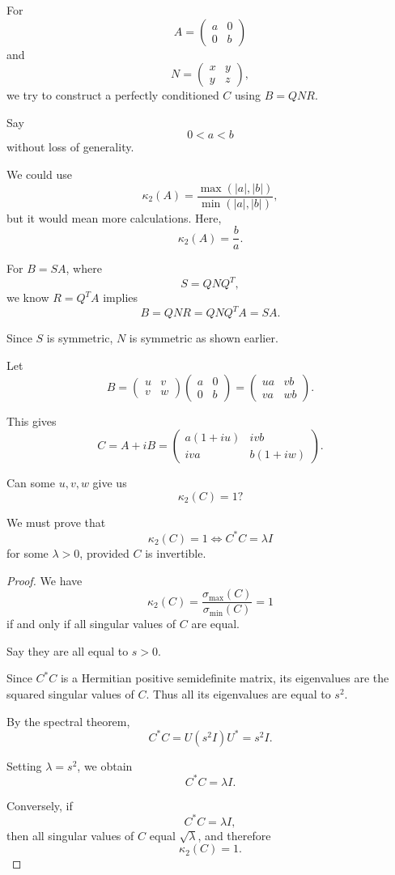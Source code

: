 \documentclass[11pt, reqno, a4paper]{amsart}
\theoremstyle{plain}
\theoremstyle{definition}
\theoremstyle{remark}
\numberwithin{equation}{section}
\begin{document}
For
\[
A=
\begin{pmatrix}
a&0\\
0&b
\end{pmatrix}
\]
and
\[
N=
\begin{pmatrix}
x&y\\
y&z
\end{pmatrix},
\]
we try to construct a perfectly conditioned $C$ using $B=QNR$.

Say
\[
0<a<b
\]
without loss of generality.

We could use
\[
\kappa_2(A)
=
\frac{\max(|a|,|b|)}{\min(|a|,|b|)},
\]
but it would mean more calculations. Here,
\[
\kappa_2(A)=\frac{b}{a}.
\]

For $B=SA$, where
\[
S=QNQ^T,
\]
we know $R=Q^TA$ implies
\[
B=QNR=QNQ^TA=SA.
\]

Since $S$ is symmetric, $N$ is symmetric as shown earlier.

Let
\[
B=
\begin{pmatrix}
u&v\\
v&w
\end{pmatrix}
\begin{pmatrix}
a&0\\
0&b
\end{pmatrix}
=
\begin{pmatrix}
ua&vb\\
va&wb
\end{pmatrix}.
\]

This gives
\[
C=A+iB
=
\begin{pmatrix}
a(1+iu)&ivb\\
iva&b(1+iw)
\end{pmatrix}.
\]

Can some $u,v,w$ give us
\[
\kappa_2(C)=1?
\]

We must prove that
\[
\kappa_2(C)=1
\iff
C^*C=\lambda I
\]
for some $\lambda>0$, provided $C$ is invertible.

\begin{proof}
We have
\[
\kappa_2(C)
=
\frac{\sigma_{\max}(C)}{\sigma_{\min}(C)}
=1
\]
if and only if all singular values of $C$ are equal.

Say they are all equal to $s>0$.

Since $C^*C$ is a Hermitian positive semidefinite matrix, its eigenvalues are the squared singular values of $C$. Thus all its eigenvalues are equal to $s^2$.

By the spectral theorem,
\[
C^*C=U(s^2I)U^*=s^2I.
\]

Setting $\lambda=s^2$, we obtain
\[
C^*C=\lambda I.
\]

Conversely, if
\[
C^*C=\lambda I,
\]
then all singular values of $C$ equal $\sqrt{\lambda}$, and therefore
\[
\kappa_2(C)=1.
\]
\end{proof}
\end{document}
